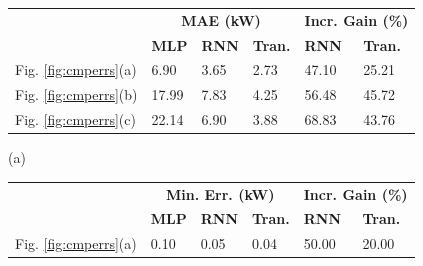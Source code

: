 \begin{table}[H]
	\centering
	\begin{subfigure}{\textwidth}
		\centering
		\begin{tabular}{l|l|l|l|l|l}
			                          & \multicolumn{3}{c|}{\textbf{MAE (kW)}}
			                          & \multicolumn{2}{c}{\textbf{Incr. Gain (\%)}}                                                                 \\
			\cline{2-6}
			                          & \textbf{MLP}                                 & \textbf{RNN} & \textbf{Tran.} & \textbf{RNN} & \textbf{Tran.} \\
			\hline
			Fig. \ref{fig:cmperrs}(a) & 6.90                                         & 3.65         & 2.73           & 47.10        & 25.21          \\
			Fig. \ref{fig:cmperrs}(b) & 17.99                                        & 7.83         & 4.25           & 56.48        & 45.72          \\
			Fig. \ref{fig:cmperrs}(c) & 22.14                                        & 6.90         & 3.88           & 68.83        & 43.76
		\end{tabular}
		\caption*{(a)}
	\end{subfigure}
	\begin{subfigure}{\textwidth}
		\centering
		\begin{tabular}{l|l|l|l|l|l}
			                          & \multicolumn{3}{c|}{\textbf{Min. Err. (kW)}}
			                          & \multicolumn{2}{c}{\textbf{Incr. Gain (\%)}}                                                                 \\
			\cline{2-6}
			                          & \textbf{MLP}                                 & \textbf{RNN} & \textbf{Tran.} & \textbf{RNN} & \textbf{Tran.} \\
			\hline
			Fig. \ref{fig:cmperrs}(a) & 0.10                                         & 0.05         & 0.04           & 50.00        & 20.00          \\

\end{tabular}
\end{subfigure}
\end{table}
